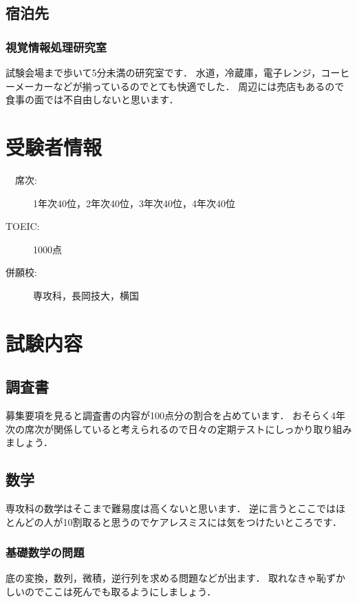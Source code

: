 \documentclass[dvipdfmx]{jsarticle}
\begin{document}
\subsection{宿泊先}
\subsubsection*{視覚情報処理研究室}
試験会場まで歩いて5分未満の研究室です．
水道，冷蔵庫，電子レンジ，コーヒーメーカーなどが揃っているのでとても快適でした．
周辺には売店もあるので食事の面では不自由しないと思います．

\section{受験者情報}
\begin{description}
  \item[ 　席次:] 1年次40位，2年次40位，3年次40位，4年次40位
  \item[TOEIC:] 1000点
  \item[ 併願校:] 専攻科，長岡技大，横国
\end{description}

\section{試験内容}
\subsection{調査書}
募集要項を見ると調査書の内容が100点分の割合を占めています．
おそらく4年次の席次が関係していると考えられるので日々の定期テストにしっかり取り組みましょう．


\subsection{数学}
専攻科の数学はそこまで難易度は高くないと思います．
逆に言うとここではほとんどの人が10割取ると思うのでケアレスミスには気をつけたいところです．

\subsubsection*{基礎数学の問題}
底の変換，数列，微積，逆行列を求める問題などが出ます．
取れなきゃ恥ずかしいのでここは死んでも取るようにしましょう．
\end{document}
